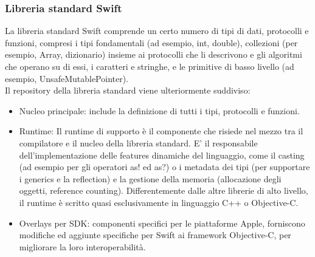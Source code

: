 \subsubsection{Libreria standard Swift}
La libreria standard Swift comprende un certo numero di tipi di dati, protocolli e funzioni, compresi i tipi fondamentali (ad esempio, int, double), collezioni (per esempio, Array, dizionario) insieme ai protocolli che li descrivono e gli algoritmi che operano su di essi, i caratteri e stringhe, e le primitive di basso livello (ad esempio, UnsafeMutablePointer).\\
Il repository della libreria standard viene ulteriormente suddiviso:
\begin{itemize}
\item Nucleo principale: include la definizione di tutti i tipi, protocolli e funzioni.
\item Runtime: Il runtime di supporto è il componente che risiede nel mezzo tra il compilatore e il nucleo della libreria standard. E' il responsabile dell'implementazione delle features dinamiche del linguaggio, come il casting  (ad esempio per gli operatori as! ed as?) o i metadata dei tipi (per supportare i generics e la reflection) e la gestione della memoria (allocazione degli oggetti, reference counting). Differentemente dalle altre librerie di alto livello, il runtime è scritto quasi esclusivamente in linguaggio C++ o Objective-C.
\item Overlays per SDK: componenti specifici per le piattaforme Apple, forniscono modifiche ed aggiunte specifiche per Swift ai framework Objective-C, per migliorare la loro interoperabilità. 
\end{itemize}
